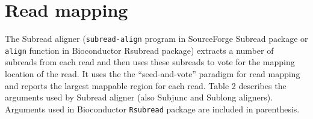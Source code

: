 \documentclass[12pt]{report}
\newcommand{\code}[1]{{\small\texttt{#1}}}
\newcommand{\Subread}{\textsf{Subread}}
\newcommand{\Subjunc}{\textsf{Subjunc}}
\newcommand{\Sublong}{\textsf{Sublong}}
\newcommand{\Rsubread}{\textsf{Rsubread}}
\begin{document}
\newpage

\section{Read mapping}

The {\Subread} aligner (\texttt{subread-align} program in SourceForge {\Subread} package or \code{align} function in Bioconductor {\Rsubread} package) extracts a number of subreads from each read and then uses these subreads to vote for the mapping location of the read.
It uses the the ``seed-and-vote'' paradigm for read mapping and reports the largest mappable region for each read.
Table 2 describes the arguments used by {\Subread} aligner (also {\Subjunc} and {\Sublong} aligners).
Arguments used in Bioconductor \code{Rsubread} package are included in parenthesis.\\
\end{document}
